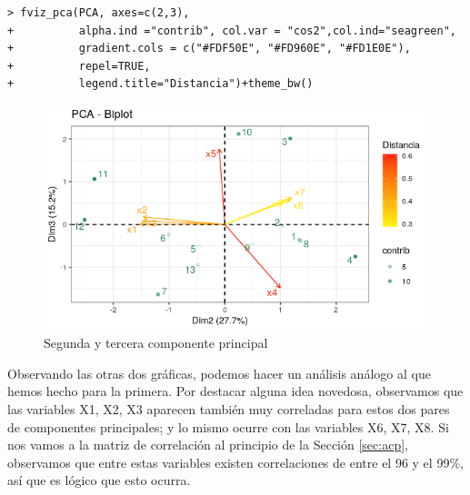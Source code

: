 \documentclass[12pt]{article}
\begin{document}
\begin{verbatim}
> fviz_pca(PCA, axes=c(2,3),
+          alpha.ind ="contrib", col.var = "cos2",col.ind="seagreen",
+          gradient.cols = c("#FDF50E", "#FD960E", "#FD1E0E"),
+          repel=TRUE,
+          legend.title="Distancia")+theme_bw()
\end{verbatim}

\begin{figure}[H]
  \centering
  \includegraphics[width=120mm]{imgs/biplot23}
  \caption{Segunda y tercera componente principal}
  \label{fig:biplot23}
\end{figure}
\vspace{-5mm}
Observando las otras dos gráficas, podemos hacer un análisis análogo
al que hemos hecho para la primera. Por destacar alguna idea novedosa,
observamos que las variables X1, X2, X3 aparecen también muy
correladas para estos dos pares de componentes principales; y lo mismo
ocurre con las variables X6, X7, X8. Si nos vamos a la matriz de
correlación al principio de la Sección \ref{sec:acp}, observamos que
entre estas variables existen correlaciones de entre el 96 y el 99\%,
así que es lógico que esto ocurra.
\end{document}

